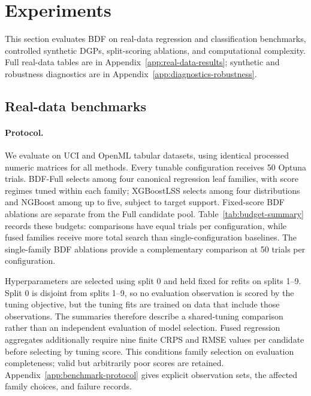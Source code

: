 \section{Experiments}\label{sec:experiments}

This section evaluates BDF on real-data regression and classification benchmarks, controlled synthetic DGPs, split-scoring ablations, and computational complexity. Full real-data tables are in Appendix~\ref{app:real-data-results}; synthetic and robustness diagnostics are in Appendix~\ref{app:diagnostics-robustness}.

\subsection{Real-data benchmarks}\label{subsec:exp_real}

\paragraph{Protocol.}
We evaluate on UCI and OpenML tabular datasets, using identical processed numeric matrices for all methods. Every tunable configuration receives 50 Optuna trials. BDF-Full selects among four canonical regression leaf families, with score regimes tuned within each family; XGBoostLSS selects among four distributions and NGBoost among up to five, subject to target support. Fixed-score BDF ablations are separate from the Full candidate pool. Table~\ref{tab:budget-summary} records these budgets: comparisons have equal trials per configuration, while fused families receive more total search than single-configuration baselines. The single-family BDF ablations provide a complementary comparison at 50 trials per configuration.

Hyperparameters are selected using split 0 and held fixed for refits on splits 1--9. Split 0 is disjoint from splits 1--9, so no evaluation observation is scored by the tuning objective, but the tuning fits are trained on data that include those observations. The summaries therefore describe a shared-tuning comparison rather than an independent evaluation of model selection. Fused regression aggregates additionally require nine finite CRPS and RMSE values per candidate before selecting by tuning score. This conditions family selection on evaluation completeness; valid but arbitrarily poor scores are retained. Appendix~\ref{app:benchmark-protocol} gives explicit observation sets, the affected family choices, and failure records.

